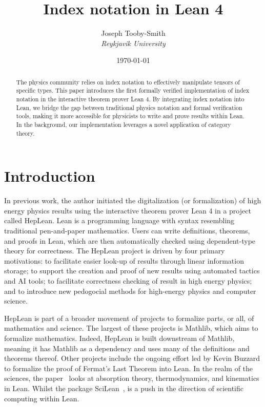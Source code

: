 \documentclass[a4paper, 11pt]{article}
\title{Index notation in Lean 4}
\author{Joseph Tooby-Smith \\ \textit{Reykjavik University}}
\date{\today}
\begin{document}
\maketitle
\vspace{-1cm}
\begin{abstract}
The physics community relies on index notation to effectively manipulate tensors of specific 
types. This paper introduces the first formally verified implementation of index notation in the
interactive theorem prover Lean 4. By integrating index notation into Lean, we bridge the gap between 
traditional physics notation and formal verification tools, 
making it more accessible for physicists to write and prove results within Lean.
In the background, our implementation leverages a novel application of category theory.
\end{abstract}

\section{Introduction}

In previous work, the author initiated the digitalization (or formalization) 
of high energy physics 
results using the interactive theorem prover Lean 4 in a project called HepLean. 
Lean is a
programming language with syntax resembling traditional pen-and-paper mathematics. 
Users can write definitions, theorems, and proofs in Lean,
which are then automatically checked using dependent-type theory for correctness.
The HepLean project is driven by four primary motivations: to facilitate easier look-up of results
 through linear information storage; to support the creation and proof of new results using 
 automated tactics and AI tools; to facilitate correctness checking of result in high energy physics; 
 and to introduce new pedogocial methods for high-energy physics and computer science.

HepLean is part of a broader movement of projects
to formalize parts, or all, of 
mathematics and science. The largest of these projects is Mathlib, which aims to formalize
mathematics. Indeed, HepLean is built downstream of Mathlib, meaning it has Mathlib as a 
dependency and uses many of the definitions and theorems thereof. 
Other projects include the ongoing effort led by Kevin Buzzard to formalize the proof of Fermat's
Last Theorem into Lean. 
In the realm of the sciences, the paper~\cite{josephson} looks at absorption theory, thermodynamics, and kinematics in Lean. 
Whilst the package SciLean~\cite{SciLean}, is a push in the direction of scientific computing within Lean. 
\end{document}
